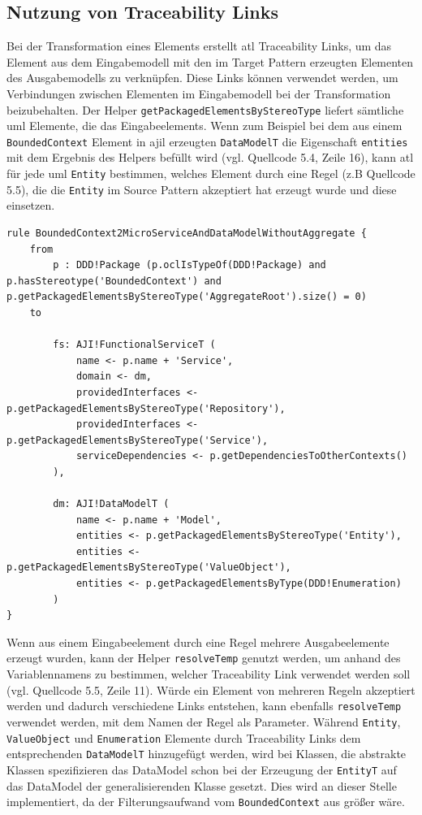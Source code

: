 \documentclass[
	oneside,  %
	ngerman, 
	final, 
	11pt, 
	a4paper, 
	1.1headlines, 
	headinclude=false, 
	footinclude=false, 
	mpinclude=false, 
	pagesize, 
	onecolumn, 
	titlepage, 
	parskip=half, 
	headsepline, 
	chapterprefix=false, 
	version=first, 
	listof=totoc, 
	bibliography=totoc, 
	toc=graduated, 
	fleqn
]{scrbook}
\begin{document}
\subsection{Nutzung von Traceability Links}
Bei der Transformation eines Elements erstellt \ac{atl} Traceability Links, um das Element aus dem Eingabemodell mit den im Target Pattern erzeugten Elementen des Ausgabemodells zu verknüpfen. Diese Links können verwendet werden, um Verbindungen zwischen Elementen im Eingabemodell bei der Transformation beizubehalten. Der Helper \texttt{getPackagedElementsByStereoType} liefert sämtliche \ac{uml} Elemente, die das Eingabeelements. Wenn zum Beispiel bei dem aus einem \texttt{BoundedContext} Element in \ac{ajil} erzeugten \texttt{DataModelT} die Eigenschaft \texttt{entities} mit dem Ergebnis des Helpers befüllt wird (vgl. Quellcode 5.4, Zeile 16), kann \ac{atl} für jede \ac{uml} \texttt{Entity} bestimmen, welches Element durch eine Regel (z.B Quellcode 5.5), die die \texttt{Entity} im Source Pattern akzeptiert hat erzeugt wurde und diese einsetzen.  
\begin{lstlisting}[caption={Regel zur Erzeugung eines Microservices},captionpos=b,label=Quellcode:BoundedContext2MicroServiceAndDataModelWithoutAggregate] 
rule BoundedContext2MicroServiceAndDataModelWithoutAggregate {
	from
		p : DDD!Package (p.oclIsTypeOf(DDD!Package) and p.hasStereotype('BoundedContext') and p.getPackagedElementsByStereoType('AggregateRoot').size() = 0)
	to
		
		fs: AJI!FunctionalServiceT (
			name <- p.name + 'Service',
			domain <- dm,
			providedInterfaces <- p.getPackagedElementsByStereoType('Repository'),
			providedInterfaces <- p.getPackagedElementsByStereoType('Service'),
			serviceDependencies <- p.getDependenciesToOtherContexts()
		),
		
		dm:	AJI!DataModelT (
			name <- p.name + 'Model',
			entities <- p.getPackagedElementsByStereoType('Entity'),
			entities <- p.getPackagedElementsByStereoType('ValueObject'),
			entities <- p.getPackagedElementsByType(DDD!Enumeration)
		)
}
\end{lstlisting}
Wenn aus einem Eingabeelement durch eine Regel mehrere Ausgabeelemente erzeugt wurden, kann der Helper \texttt{resolveTemp} genutzt werden, um anhand des Variablennamens zu bestimmen, welcher Traceability Link verwendet werden soll (vgl. Quellcode 5.5, Zeile 11). Würde ein Element von mehreren Regeln akzeptiert werden und dadurch verschiedene Links entstehen, kann ebenfalls \texttt{resolveTemp} verwendet werden, mit dem Namen der Regel als Parameter. Während \texttt{Entity}, \texttt{ValueObject} und \texttt{Enumeration} Elemente durch Traceability Links dem entsprechenden \texttt{DataModelT} hinzugefügt werden, wird bei Klassen, die abstrakte Klassen spezifizieren das DataModel schon bei der Erzeugung der \texttt{EntityT} auf das DataModel der generalisierenden Klasse gesetzt. Dies wird an dieser Stelle implementiert, da der Filterungsaufwand vom \texttt{BoundedContext} aus größer wäre.
\end{document}
